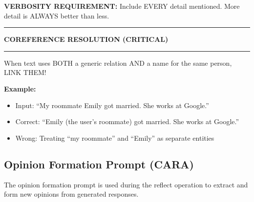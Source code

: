 \begin{tcolorbox}
\textbf{VERBOSITY REQUIREMENT:} Include EVERY detail mentioned. More detail is ALWAYS better than less.

\vspace{0.2cm}

\rule{\linewidth}{0.4pt}

\textbf{COREFERENCE RESOLUTION (CRITICAL)}

\rule{\linewidth}{0.4pt}

\vspace{0.2cm}

When text uses BOTH a generic relation AND a name for the same person, LINK THEM!

\textbf{Example:}
\begin{itemize}
    \item Input: ``My roommate Emily got married. She works at Google.''
    \item Correct: ``Emily (the user's roommate) got married. She works at Google.''
    \item Wrong: Treating ``my roommate'' and ``Emily'' as separate entities
\end{itemize}
\end{tcolorbox}

\subsection{Opinion Formation Prompt (CARA)}
\label{sec:appendix-opinion-formation}

The opinion formation prompt is used during the reflect operation to extract and form new opinions from generated responses.

